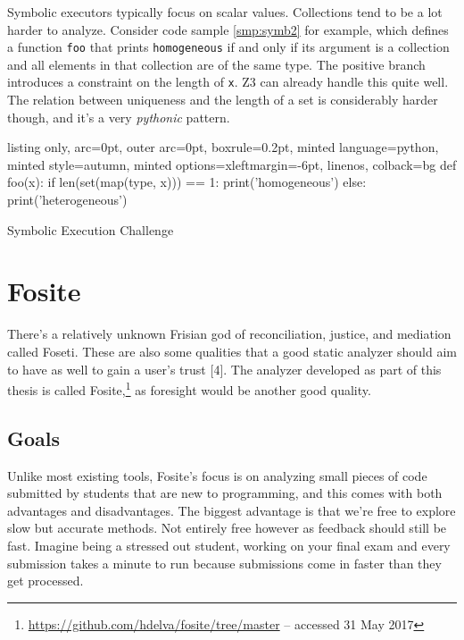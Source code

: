 \documentclass[a4paper, 16pt, oneside]{Thesis}
\begin{document}
\vspace{-1pt}

Symbolic executors typically focus on scalar values. Collections tend to
be a lot harder to analyze. Consider code sample \ref{smp:symb2} for
example, which defines a function \texttt{foo} that prints
\texttt{homogeneous} if and only if its argument is a collection and all
elements in that collection are of the same type. The positive branch
introduces a constraint on the length of \texttt{x}. Z3 can already
handle this quite well. The relation between uniqueness and the length
of a set is considerably harder though, and it's a very \emph{pythonic}
pattern.

\vspace{-1pt}

\begin{code}
  \begin{tcblisting}{listing only, 
  arc=0pt,
  outer arc=0pt, 
  boxrule=0.2pt,
  minted language=python,
  minted style=autumn,
  minted options={xleftmargin=-6pt, linenos},
  colback=bg }
def foo(x):
  if len(set(map(type, x))) == 1:
    print('homogeneous')
  else:
    print('heterogeneous')
\end{tcblisting}
\caption{Symbolic Execution Challenge} \label{smp:symb2}
\end{code}

\chapter{Fosite}\label{fosite}

There's a relatively unknown Frisian god of reconciliation, justice, and
mediation called Foseti. These are also some qualities that a good
static analyzer should aim to have as well to gain a user's trust
{[}4{]}. The analyzer developed as part of this thesis is called
Fosite,\footnote{\url{https://github.com/hdelva/fosite/tree/master} --
  accessed 31 May 2017} as foresight would be another good quality.

\section{Goals}\label{goals}

Unlike most existing tools, Fosite's focus is on analyzing small pieces
of code submitted by students that are new to programming, and this
comes with both advantages and disadvantages. The biggest advantage is
that we're free to explore slow but accurate methods. Not entirely free
however as feedback should still be fast. Imagine being a stressed out
student, working on your final exam and every submission takes a minute
to run because submissions come in faster than they get processed.
\end{document}
